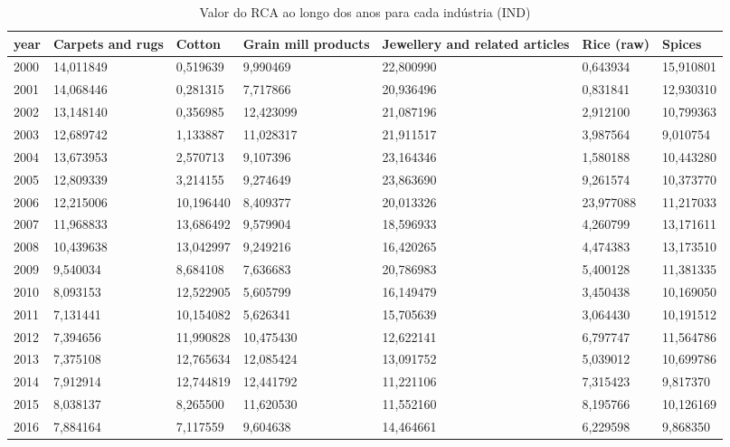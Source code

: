 \begin{table}
\centering
\caption{Valor do RCA ao longo dos anos para cada indústria (IND)}
\begin{tabular}{p{1cm}p{2cm}p{2cm}p{2cm}p{2cm}p{2cm}p{2cm}}
\toprule
 year &  Carpets and rugs &    Cotton &  Grain mill products &  Jewellery and related articles &  Rice (raw) &    Spices \\
\midrule
 2000 &         14,011849 &  0,519639 &             9,990469 &                       22,800990 &    0,643934 & 15,910801 \\
 2001 &         14,068446 &  0,281315 &             7,717866 &                       20,936496 &    0,831841 & 12,930310 \\
 2002 &         13,148140 &  0,356985 &            12,423099 &                       21,087196 &    2,912100 & 10,799363 \\
 2003 &         12,689742 &  1,133887 &            11,028317 &                       21,911517 &    3,987564 &  9,010754 \\
 2004 &         13,673953 &  2,570713 &             9,107396 &                       23,164346 &    1,580188 & 10,443280 \\
 2005 &         12,809339 &  3,214155 &             9,274649 &                       23,863690 &    9,261574 & 10,373770 \\
 2006 &         12,215006 & 10,196440 &             8,409377 &                       20,013326 &   23,977088 & 11,217033 \\
 2007 &         11,968833 & 13,686492 &             9,579904 &                       18,596933 &    4,260799 & 13,171611 \\
 2008 &         10,439638 & 13,042997 &             9,249216 &                       16,420265 &    4,474383 & 13,173510 \\
 2009 &          9,540034 &  8,684108 &             7,636683 &                       20,786983 &    5,400128 & 11,381335 \\
 2010 &          8,093153 & 12,522905 &             5,605799 &                       16,149479 &    3,450438 & 10,169050 \\
 2011 &          7,131441 & 10,154082 &             5,626341 &                       15,705639 &    3,064430 & 10,191512 \\
 2012 &          7,394656 & 11,990828 &            10,475430 &                       12,622141 &    6,797747 & 11,564786 \\
 2013 &          7,375108 & 12,765634 &            12,085424 &                       13,091752 &    5,039012 & 10,699786 \\
 2014 &          7,912914 & 12,744819 &            12,441792 &                       11,221106 &    7,315423 &  9,817370 \\
 2015 &          8,038137 &  8,265500 &            11,620530 &                       11,552160 &    8,195766 & 10,126169 \\
 2016 &          7,884164 &  7,117559 &             9,604638 &                       14,464661 &    6,229598 &  9,868350 \\
\bottomrule
\end{tabular}
\end{table}
